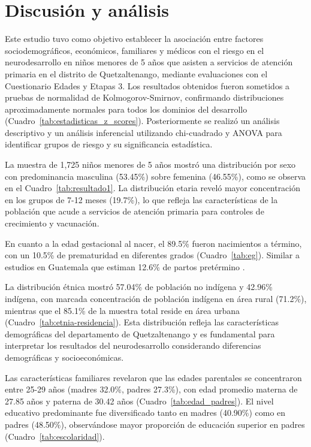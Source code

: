 \chapter{Discusión y análisis}
Este estudio tuvo como objetivo establecer la asociación entre factores 
sociodemográficos, económicos, familiares y médicos con el riesgo en el 
neurodesarrollo en niños menores de 5 años que asisten a servicios de atención 
primaria en el distrito de Quetzaltenango, mediante evaluaciones con el
Cuestionario Edades y Etapas 3. Los resultados obtenidos fueron sometidos a
pruebas de normalidad de Kolmogorov-Smirnov, confirmando distribuciones
aproximadamente normales para todos los dominios del desarrollo 
(Cuadro~\ref{tab:estadisticas_z_scores}). Posteriormente se realizó un análisis 
descriptivo y un análisis inferencial utilizando chi-cuadrado y ANOVA para
identificar grupos de riesgo y su significancia estadística.

La muestra de 1,725 niños menores de 5 años mostró una distribución por sexo 
con predominancia masculina (53.45\%) sobre femenina (46.55\%), como se observa
en el Cuadro~\ref{tab:resultado1}. La distribución etaria reveló mayor
concentración en los grupos de 7-12 meses (19.7\%), lo que refleja las
características de la población que acude a servicios de atención primaria para
controles de crecimiento y vacunación. 

En cuanto a la edad gestacional al nacer, el 89.5\% fueron nacimientos a
término, con un 10.5\% de prematuridad en diferentes grados
(Cuadro~\ref{tab:eg}). Similar a estudios en Guatemala que estiman 12.6\% de
partos pretérmino \cite{Pusdekar2020}.

La distribución étnica mostró 57.04\% de población no indígena y 42.96\%
indígena, con marcada concentración de población indígena en área rural
(71.2\%), mientras que el 85.1\% de la muestra total reside en área urbana 
(Cuadro~\ref{tab:etnia-residencia}). Esta distribución refleja las
características demográficas del departamento de Quetzaltenango y es fundamental
para interpretar los resultados del neurodesarrollo considerando diferencias
demográficas y socioeconómicas.

Las características familiares revelaron que las edades parentales se
concentraron entre 25-29 años (madres 32.0\%, padres 27.3\%), con edad promedio
materna de 27.85 años y paterna de 30.42 años (Cuadro~\ref{tab:edad_padres}). El
nivel educativo predominante fue diversificado tanto en madres (40.90\%) como en
padres (48.50\%), observándose mayor proporción de educación superior en padres 
(Cuadro~\ref{tab:escolaridad}).

